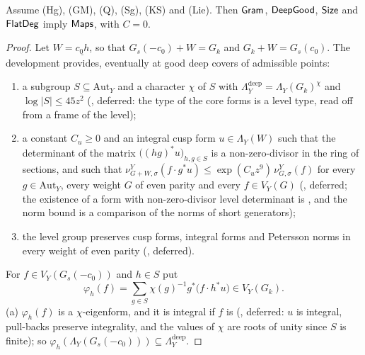 \begin{proposition}\label{pf:lift2:maps}
Assume \textup{(Hg)}, \textup{(GM)}, \textup{(Q)}, \textup{(Sg)}, \textup{(KS)} and \textup{(Lie)}. Then $\mathsf{Gram}$, $\mathsf{DeepGood}$, $\mathsf{Size}$ and
$\mathsf{FlatDeg}$ imply $\mathsf{Maps}$, with $C=0$.
\end{proposition}

\begin{proof}
Let $W=\underline{c_0h}$, so that $G_s(-c_0)+W=G_k$ and $G_k+W=G_s(c_0)$. The development provides, eventually at
good deep covers of admissible points:
\begin{enumerate}[label=(\roman*)]
\item a subgroup $S\subseteq\mathrm{Aut}_Y$ and a character $\chi$ of $S$ with $\Lambda^{\mathrm{deep}}_Y=
\Lambda_Y(G_k)^{\chi}$ and $\log|S|\le45z^2$
(, deferred: the type of the core forms is a level
type, read off from a frame of the level);
\item a constant $C_u\ge0$ and an integral cusp form $u\in\Lambda_Y(W)$ such that the determinant of the matrix
$\bigl((hg)^*u\bigr)_{h,g\in S}$ is a non-zero-divisor in the ring of sections, and such that
$\nu^Y_{G+W,\sigma}(f\cdot g^*u)\le\exp(C_uz^9)\,\nu^Y_{G,\sigma}(f)$ for every $g\in\mathrm{Aut}_Y$, every weight $G$ of
even parity and every $f\in V_Y(G)$ (,
deferred; the existence of a form with non-zero-divisor level determinant is
, and the norm bound is a comparison of the norms of short
generators);
\item the level group preserves cusp forms, integral forms and Petersson norms in every weight of even parity
(, deferred).
\end{enumerate}
For $f\in V_Y(G_s(-c_0))$ and $h\in S$ put
\[
\varphi_h(f)=\sum_{g\in S}\chi(g)^{-1}g^*\bigl(f\cdot h^*u\bigr)\in V_Y(G_k).
\]
(a) $\varphi_h(f)$ is a $\chi$-eigenform, and it is integral if $f$ is (,
deferred: $u$ is integral, pull-backs preserve integrality, and the values of $\chi$ are roots of unity since $S$ is
finite); so $\varphi_h(\Lambda_Y(G_s(-c_0)))\subseteq\Lambda^{\mathrm{deep}}_Y$.

\end{proof}
